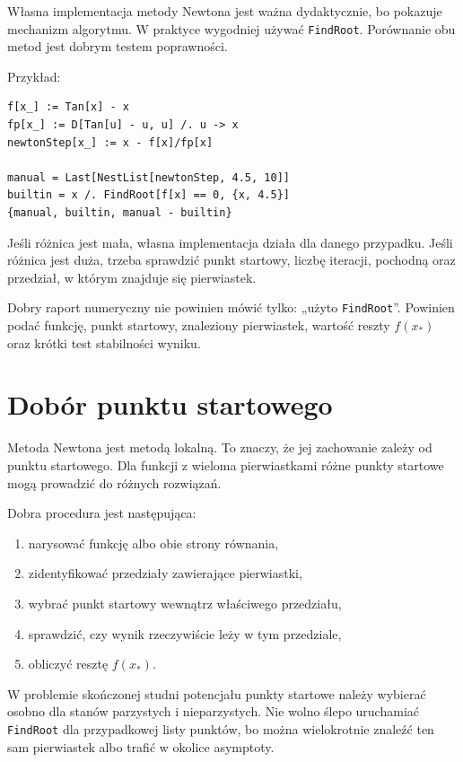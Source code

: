 Własna implementacja metody Newtona jest ważna dydaktycznie, bo pokazuje mechanizm algorytmu. W praktyce wygodniej używać \texttt{FindRoot}. Porównanie obu metod jest dobrym testem poprawności.

Przykład:
\begin{verbatim}
f[x_] := Tan[x] - x
fp[x_] := D[Tan[u] - u, u] /. u -> x
newtonStep[x_] := x - f[x]/fp[x]

manual = Last[NestList[newtonStep, 4.5, 10]]
builtin = x /. FindRoot[f[x] == 0, {x, 4.5}]
{manual, builtin, manual - builtin}
\end{verbatim}
Jeśli różnica jest mała, własna implementacja działa dla danego przypadku. Jeśli różnica jest duża, trzeba sprawdzić punkt startowy, liczbę iteracji, pochodną oraz przedział, w którym znajduje się pierwiastek.

\begin{examplebox}
Dobry raport numeryczny nie powinien mówić tylko: „użyto \texttt{FindRoot}”. Powinien podać funkcję, punkt startowy, znaleziony pierwiastek, wartość reszty \(f(x_*)\) oraz krótki test stabilności wyniku.
\end{examplebox}

\section{Dobór punktu startowego}

Metoda Newtona jest metodą lokalną. To znaczy, że jej zachowanie zależy od punktu startowego. Dla funkcji z wieloma pierwiastkami różne punkty startowe mogą prowadzić do różnych rozwiązań.

Dobra procedura jest następująca:
\begin{enumerate}
    \item narysować funkcję albo obie strony równania,
    \item zidentyfikować przedziały zawierające pierwiastki,
    \item wybrać punkt startowy wewnątrz właściwego przedziału,
    \item sprawdzić, czy wynik rzeczywiście leży w tym przedziale,
    \item obliczyć resztę \(f(x_*)\).
\end{enumerate}

W problemie skończonej studni potencjału punkty startowe należy wybierać osobno dla stanów parzystych i nieparzystych. Nie wolno ślepo uruchamiać \texttt{FindRoot} dla przypadkowej listy punktów, bo można wielokrotnie znaleźć ten sam pierwiastek albo trafić w okolice asymptoty.

